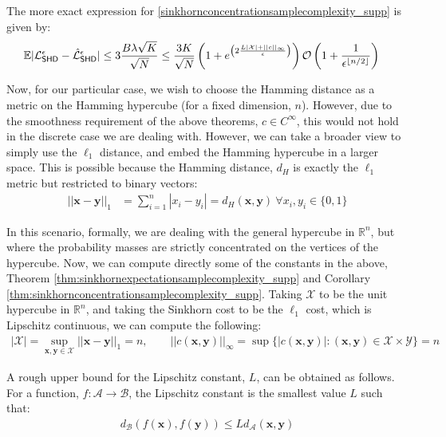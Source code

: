 The more exact expression for \eqref{sinkhornconcentrationsamplecomplexity_supp} is given by:
\begin{align}
     \mathbb{E}|\mathcal{L}_{\operatorname{\textsf{SHD}}}^\epsilon - \hat{\mathcal{L}}_{\operatorname{\textsf{SHD}}}^\epsilon| &\leq 3\frac{B\lambda\sqrt{K}}{\sqrt{N}}
     \leq \frac{3K}{\sqrt{N}}\left(1+e^{\left(2\frac{L|\mathcal{X}|+||c||_{\infty}}{\epsilon}\right)}\right)\mathcal{O}\left(1+\frac{1}{\epsilon^{\lfloor n/2\rfloor}}\right)
\end{align}

Now, for our particular case, we wish to choose the Hamming distance as a metric on the Hamming hypercube (for a fixed dimension, $n$). However, due to the smoothness requirement of the above theorems, $c \in C^\infty$, this would not hold in the discrete case we are dealing with. However, we can take a broader view to simply use the $\ell_1$ distance, and embed the Hamming hypercube in a larger space. This is possible because the Hamming distance, $d_{H}$ is exactly the $\ell_1$ metric but restricted to binary vectors:
\begin{align}
    ||\mathbf{x} - \mathbf{y}||_1  & = \sum\limits_{i=1}^n|x_i-y_i| = d_H(\mathbf{x}, \mathbf{y}) ~ \forall x_i, y_i \in \{0, 1\} \label{samplecomplexityexpanded_supp}
\end{align}

In this scenario, formally, we are dealing with the general hypercube in $\mathbb{R}^n$, but where the probability masses are strictly concentrated on the vertices of the hypercube. Now, we can compute directly some of the constants in the above, Theorem \ref{thm:sinkhornexpectationsamplecomplexity_supp} and Corollary \ref{thm:sinkhornconcentrationsamplecomplexity_supp}. Taking $\mathcal{X}$ to be the unit hypercube in $\mathbb{R}^n$, and taking the Sinkhorn cost to be the $\ell_1$ cost, which is Lipschitz continuous, we can compute the following:
\begin{align}
    |\mathcal{X}| = \sup_{\mathbf{x}, \mathbf{y} \in \mathcal{X}}||\mathbf{x} - \mathbf{y}||_1= n,\qquad
    ||c(\mathbf{x}, \mathbf{y})||_\infty = \sup\{|c(\mathbf{x}, \mathbf{y})| : (\mathbf{x}, \mathbf{y}) \in \mathcal{X}\times \mathcal{Y}\} = n\label{sinkhorn_sample_complexity_calcs}
\end{align}
 
A rough upper bound for the Lipschitz constant, $L$, can be obtained as follows. For a function, $f:\mathcal{A}\rightarrow\mathcal{B}$, the Lipschitz constant is the smallest value $L$ such that:
\begin{align}
    d_{\mathcal{B}}(f(\mathbf{x}),f(\mathbf{y})) \leq L d_{\mathcal{A}}(\mathbf{x}, \mathbf{y}) \label{lipschitzcontinuous_supp}
\end{align}


